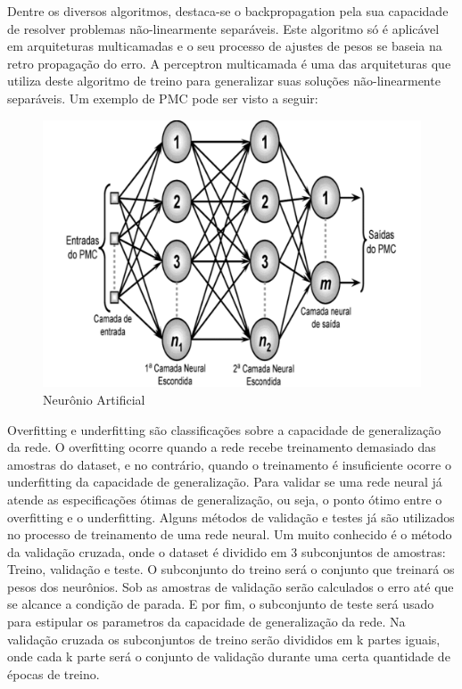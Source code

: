 Dentre os diversos algoritmos, destaca-se o backpropagation pela sua capacidade de resolver problemas não-linearmente separáveis. Este algoritmo só é aplicável em arquiteturas multicamadas e o seu processo de ajustes de pesos se baseia na retro propagação do erro. A perceptron multicamada é uma das arquiteturas que utiliza deste algoritmo de treino para generalizar suas soluções não-linearmente separáveis. Um exemplo de PMC pode ser visto a seguir:
\begin{figure}[h]
	\centering
    \label{fig1}
    \vspace{3ex}%
	\includegraphics[scale=0.4]{pasta1_figuras/pmc.pdf}
    \caption{Neurônio Artificial}
\end{figure}

Overfitting e underfitting são classificações sobre a capacidade de generalização da rede. O overfitting ocorre quando a rede recebe treinamento demasiado das amostras do dataset, e no contrário, quando o treinamento é insuficiente ocorre o underfitting da capacidade de generalização. Para validar se uma rede neural já atende as especificações ótimas de generalização, ou seja, o ponto ótimo entre o overfitting e o underfitting. Alguns métodos de validação e testes já são utilizados no processo de treinamento de uma rede neural. Um muito conhecido é o método da validação cruzada, onde o dataset é dividido em 3 subconjuntos de amostras: Treino, validação e teste. O subconjunto do treino será o conjunto que treinará os pesos dos neurônios. Sob as amostras de validação serão calculados o erro até que se alcance a condição de parada. E por fim, o subconjunto de teste será usado para estipular os parametros da capacidade de generalização da rede. Na validação cruzada os subconjuntos de treino serão divididos em k partes iguais, onde cada k parte será o conjunto de validação durante uma certa quantidade de épocas de treino.
